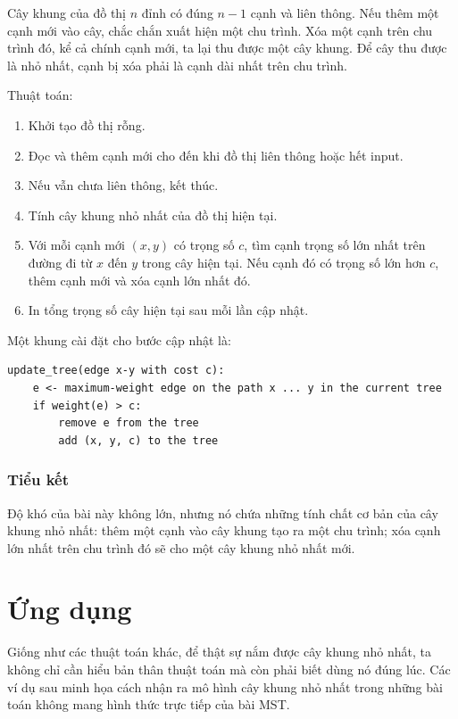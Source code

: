 \documentclass[11pt]{article}
\begin{document}
Cây khung của đồ thị $n$ đỉnh có đúng $n-1$ cạnh và liên thông. Nếu thêm một
cạnh mới vào cây, chắc chắn xuất hiện một chu trình. Xóa một cạnh trên chu
trình đó, kể cả chính cạnh mới, ta lại thu được một cây khung. Để cây thu
được là nhỏ nhất, cạnh bị xóa phải là cạnh dài nhất trên chu trình.

Thuật toán:
\begin{enumerate}
  \item Khởi tạo đồ thị rỗng.
  \item Đọc và thêm cạnh mới cho đến khi đồ thị liên thông hoặc hết input.
  \item Nếu vẫn chưa liên thông, kết thúc.
  \item Tính cây khung nhỏ nhất của đồ thị hiện tại.
  \item Với mỗi cạnh mới $(x,y)$ có trọng số $c$, tìm cạnh trọng số lớn nhất
  trên đường đi từ $x$ đến $y$ trong cây hiện tại. Nếu cạnh đó có trọng số lớn
  hơn $c$, thêm cạnh mới và xóa cạnh lớn nhất đó.
  \item In tổng trọng số cây hiện tại sau mỗi lần cập nhật.
\end{enumerate}

Một khung cài đặt cho bước cập nhật là:
\begin{verbatim}
update_tree(edge x-y with cost c):
    e <- maximum-weight edge on the path x ... y in the current tree
    if weight(e) > c:
        remove e from the tree
        add (x, y, c) to the tree
\end{verbatim}

\subsubsection*{Tiểu kết}

Độ khó của bài này không lớn, nhưng nó chứa những tính chất cơ bản của cây
khung nhỏ nhất: thêm một cạnh vào cây khung tạo ra một chu trình; xóa cạnh lớn
nhất trên chu trình đó sẽ cho một cây khung nhỏ nhất mới.

\section{Ứng dụng}

Giống như các thuật toán khác, để thật sự nắm được cây khung nhỏ nhất, ta
không chỉ cần hiểu bản thân thuật toán mà còn phải biết dùng nó đúng lúc. Các
ví dụ sau minh họa cách nhận ra mô hình cây khung nhỏ nhất trong những bài
toán không mang hình thức trực tiếp của bài MST.
\end{document}
